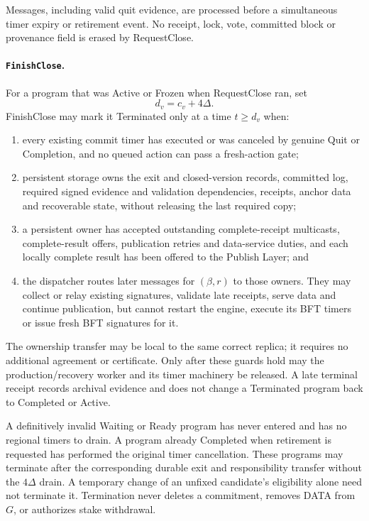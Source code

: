 Messages, including valid quit evidence, are processed before a
simultaneous timer expiry or retirement event. No receipt, lock, vote,
committed block or provenance field is erased by RequestClose.

\paragraph{\texttt{FinishClose}.}
For a program that was Active or Frozen when RequestClose ran, set
\[
 d_v=c_v+4\Delta.
\]
FinishClose may mark it Terminated only at a time $t\ge d_v$ when:
\begin{enumerate}[label=(\roman*),itemsep=2pt]
\item every existing commit timer has executed or was canceled by
genuine Quit or Completion, and no queued action can pass a fresh-action
gate;
\item persistent storage owns the exit and closed-version records,
committed log, required signed evidence and validation dependencies,
receipts, anchor data and recoverable state, without releasing the last
required copy;
\item a persistent owner has accepted outstanding complete-receipt
multicasts, complete-result offers, publication retries and data-service
duties, and each locally complete result has been offered to the
Publish Layer; and
\item the dispatcher routes later messages for $(\beta,r)$ to those
owners. They may collect or relay existing signatures, validate late
receipts, serve data and continue publication, but cannot restart the
engine, execute its BFT timers or issue fresh BFT signatures for it.
\end{enumerate}
The ownership transfer may be local to the same correct replica; it
requires no additional agreement or certificate. Only after these
guards hold may the production/recovery worker and its timer machinery
be released. A late terminal receipt records archival evidence and does
not change a Terminated program back to Completed or Active.

A definitively invalid Waiting or Ready program has never entered
and has no regional timers to drain. A program already Completed when
retirement is requested has performed the original timer cancellation.
These programs may terminate after the corresponding durable exit and
responsibility transfer without the $4\Delta$ drain. A temporary change
of an unfixed candidate's eligibility alone need not terminate it.
Termination never deletes a commitment, removes DATA from $G$, or
authorizes stake withdrawal.

